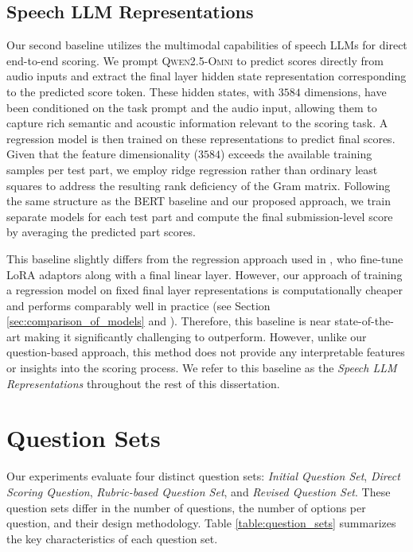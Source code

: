 \documentclass{report}
\begin{document}
\subsection{Speech LLM Representations}
Our second baseline utilizes the multimodal capabilities of speech LLMs for direct end-to-end scoring. We prompt \textsc{Qwen2.5-Omni} \citep{xu2025qwen25omnitechnicalreport} to predict scores directly from audio inputs and extract the final layer hidden state representation corresponding to the predicted score token. These hidden states, with $3584$ dimensions, have been conditioned on the task prompt and the audio input, allowing them to capture rich semantic and acoustic information relevant to the scoring task. A regression model is then trained on these representations to predict final scores. Given that the feature dimensionality ($3584$) exceeds the available training samples per test part, we employ ridge regression rather than ordinary least squares to address the resulting rank deficiency of the Gram matrix. Following the same structure as the BERT baseline and our proposed approach, we train separate models for each test part and compute the final submission-level score by averaging the predicted part scores.

This baseline slightly differs from the regression approach used in \citet{ma2025assessment}, who fine-tune LoRA adaptors along with a final linear layer. However, our approach of training a regression model on fixed final layer representations is computationally cheaper and performs comparably well in practice (see Section \ref{sec:comparison_of_models} and \citet{ma2025assessment}). Therefore, this baseline is near state-of-the-art making it significantly challenging to outperform. However, unlike our question-based approach, this method does not provide any interpretable features or insights into the scoring process. We refer to this baseline as the \emph{Speech LLM Representations} throughout the rest of this dissertation.

\section{Question Sets}
\label{sec:question_sets}
Our experiments evaluate four distinct question sets: \emph{Initial Question Set}, \emph{Direct Scoring Question}, \emph{Rubric-based Question Set}, and \emph{Revised Question Set}. These question sets differ in the number of questions, the number of options per question, and their design methodology. Table \ref{table:question_sets} summarizes the key characteristics of each question set. 
\end{document}
